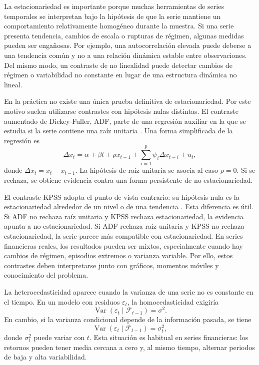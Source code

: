 La estacionariedad es importante porque muchas herramientas de series temporales se interpretan bajo la hipótesis de que la serie mantiene un comportamiento relativamente homogéneo durante la muestra. Si una serie presenta tendencia, cambios de escala o rupturas de régimen, algunas medidas pueden ser engañosas. Por ejemplo, una autocorrelación elevada puede deberse a una tendencia común y no a una relación dinámica estable entre observaciones. Del mismo modo, un contraste de no linealidad puede detectar cambios de régimen o variabilidad no constante en lugar de una estructura dinámica no lineal.

En la práctica no existe una única prueba definitiva de estacionariedad. Por este motivo suelen utilizarse contrastes con hipótesis nulas distintas. El contraste aumentado de Dickey-Fuller, ADF, parte de una regresión auxiliar en la que se estudia si la serie contiene una raíz unitaria \cite{dickey1979}. Una forma simplificada de la regresión es
\begin{equation}
    \Delta x_t = \alpha + \beta t + \rho x_{t-1}
    + \sum_{i=1}^{p}\psi_i \Delta x_{t-i} + u_t,
\end{equation}
donde \(\Delta x_t=x_t-x_{t-1}\). La hipótesis de raíz unitaria se asocia al caso \(\rho=0\). Si se rechaza, se obtiene evidencia contra una forma persistente de no estacionariedad.

El contraste KPSS adopta el punto de vista contrario: su hipótesis nula es la estacionariedad alrededor de un nivel o de una tendencia \cite{kpss1992}. Esta diferencia es útil. Si ADF no rechaza raíz unitaria y KPSS rechaza estacionariedad, la evidencia apunta a no estacionariedad. Si ADF rechaza raíz unitaria y KPSS no rechaza estacionariedad, la serie parece más compatible con estacionariedad. En series financieras reales, los resultados pueden ser mixtos, especialmente cuando hay cambios de régimen, episodios extremos o varianza variable. Por ello, estos contrastes deben interpretarse junto con gráficos, momentos móviles y conocimiento del problema.

La heterocedasticidad aparece cuando la varianza de una serie no es constante en el tiempo. En un modelo con residuos \(\varepsilon_t\), la homocedasticidad exigiría
\begin{equation}
    \operatorname{Var}(\varepsilon_t \mid \mathcal{F}_{t-1}) = \sigma^2.
\end{equation}
En cambio, si la varianza condicional depende de la información pasada, se tiene
\begin{equation}
    \operatorname{Var}(\varepsilon_t \mid \mathcal{F}_{t-1}) = \sigma_t^2,
\end{equation}
donde \(\sigma_t^2\) puede variar con \(t\). Esta situación es habitual en series financieras: los retornos pueden tener media cercana a cero y, al mismo tiempo, alternar periodos de baja y alta variabilidad.

